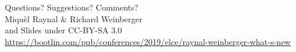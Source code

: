 \documentclass[aspectratio=169,obeyspaces,spaces,hyphens,dvipsnames]{beamer}
\begin{document}
\begin{frame}
  \centering
  \Huge
  Questions? Suggestions? Comments?\\
  \vspace{0.5cm}
  \huge
  Miquèl Raynal \& Richard Weinberger\\
  \large
  \vspace{0.5cm}
  \hspace{2.6cm} and 
  \vspace{0.5cm}
  \newline Slides under CC-BY-SA 3.0\\
  \scriptsize
  \url{https://bootlin.com/pub/conferences/2019/elce/raynal-weinberger-what-s-new}
\end{frame}
\end{document}
